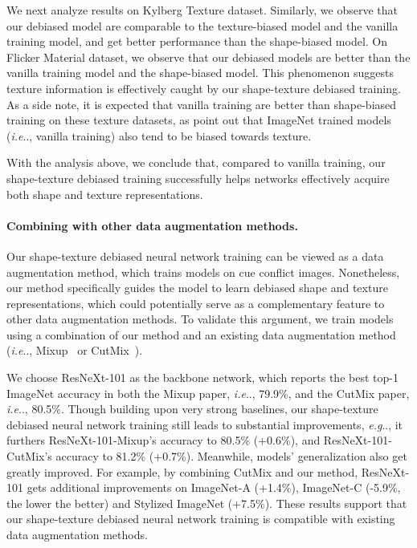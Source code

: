 \documentclass{article} \usepackage{iclr2021_conference,times}
\makeatletter
\DeclareRobustCommand\onedot{\futurelet\@let@token\@onedot}
\def\@onedot{\ifx\@let@token.\else.\null\fi\xspace}
\def\eg{\emph{e.g}\onedot} \def\Eg{\emph{E.g}\onedot}
\def\ie{\emph{i.e}\onedot} \def\Ie{\emph{I.e}\onedot}
\makeatother
\begin{document}
We next analyze results on Kylberg Texture dataset. Similarly, we observe that our debiased model are comparable to the texture-biased model and the vanilla training model, and get better performance than the shape-biased model. On Flicker Material dataset, we observe that our debiased models are better than the vanilla training model and the shape-biased model. This phenomenon suggests texture information is effectively caught by our shape-texture debiased training.
As a side note, it is expected that vanilla training are better than shape-biased training on these texture datasets, as \citet{geirhos2018imagenettrained} point out that ImageNet trained models (\ie, vanilla training) also tend to be biased towards texture.

With the analysis above, we conclude that, compared to vanilla training, our shape-texture debiased training successfully helps networks effectively acquire both shape and texture representations.



\paragraph{Combining with other data augmentation methods.}
Our shape-texture debiased neural network training can be viewed as a data augmentation method, which trains models on cue conflict images. Nonetheless, our method specifically guides the model to learn debiased shape and texture representations, which could potentially serve as a complementary feature to other data augmentation methods. To validate this argument, we train models using a combination of our method and an existing data augmentation method (\ie, Mixup~\citep{zhang2018mixup} or CutMix~\citep{yun2019cutmix}). 


We choose ResNeXt-101 \citep{xie2017aggregated} as the backbone network, which reports the best top-1 ImageNet accuracy in both the Mixup paper, \ie, 79.9\%, and the CutMix paper, \ie, 80.5\%. 
Though building upon very strong baselines, our shape-texture debiased neural network training still leads to substantial improvements, \eg, it furthers ResNeXt-101-Mixup's accuracy to 80.5\% (+0.6\%), and ResNeXt-101-CutMix's accuracy to 81.2\% (+0.7\%). Meanwhile, models' generalization also get greatly improved. For example, by combining CutMix and our method, ResNeXt-101 gets additional improvements on ImageNet-A (+1.4\%), ImageNet-C (-5.9\%, the lower the better) and Stylized ImageNet (+7.5\%).
These results support that our shape-texture debiased neural network training
is compatible with existing data augmentation methods.
\end{document}
